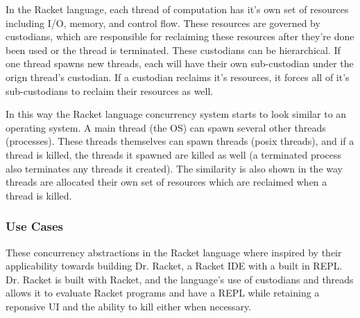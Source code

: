 \documentclass{article}
\begin{document}
In the Racket language, each thread of computation has it's
own set of resources including I/O, memory, and control flow. These
resources are governed by custodians, which are responsible for
reclaiming these resources after they're done been used or the
thread is terminated. These custodians can be hierarchical. If one
thread spawns new threads, each will have their own sub-custodian
under the orign thread's custodian. If a custodian reclaims it's
resources, it forces all of it's sub-custodians to reclaim their
resources as well.

In this way the Racket language concurrency system starts to look
similar to an operating system. A main thread (the OS) can spawn
several other threads (processes). These threads themselves can
spawn threads (posix threads), and if a thread is killed, the
threads it spawned are killed as well (a terminated process also
terminates any threads it created). The similarity is also shown
in the way threads are allocated their own set of resources which
are reclaimed when a thread is killed.

\subsubsection{Use Cases}
These concurrency abstractions in the Racket language where inspired
by their applicability towards building Dr. Racket, a Racket IDE
with a built in REPL. Dr. Racket is built with Racket, and the
language's use of custodians and threads allows it to evaluate
Racket programs and have a REPL while retaining a reponsive UI and
the ability to kill either when necessary.
\end{document}
